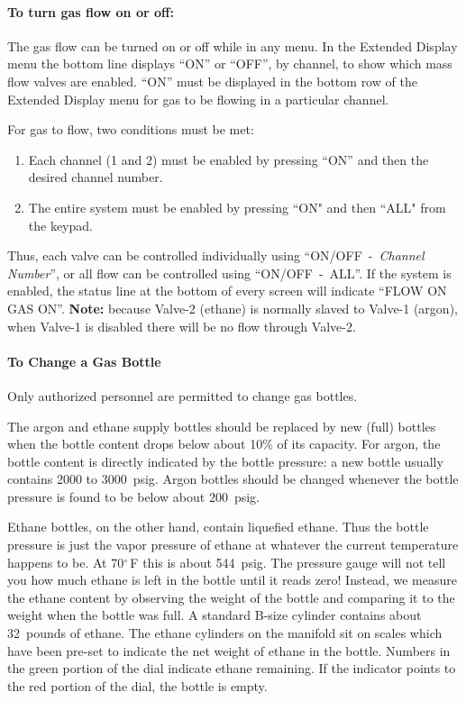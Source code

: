 {%
\paragraph{To turn gas flow on or off:}

The gas flow can be turned on or off while in any menu.  In the
Extended Display menu the bottom line displays ``ON'' or ``OFF'', by
channel, to show which mass flow valves are enabled.  ``ON'' must be
displayed in the bottom row of the Extended Display menu for gas to be
flowing in a particular channel.

For gas to flow, two conditions must be met:
\begin{enumerate}
\item Each channel (1 and 2) must be enabled by pressing ``ON'' and then the
  desired channel number.
\item The entire system must be enabled by pressing ``ON" and then ``ALL" from
  the keypad.
\end{enumerate}
Thus, each valve can be controlled individually using ``ON/OFF~-~\emph{Channel
Number}'', or all flow can be controlled using ``ON/OFF~-~ALL''. If the system
is enabled, the status line at the bottom of every screen will indicate ``FLOW
ON GAS ON''. {\bf Note:} because Valve-2 (ethane) is normally slaved to Valve-1
(argon), when Valve-1 is disabled there will be no flow through Valve-2.

\paragraph{To Change a Gas Bottle}

Only authorized personnel are permitted to change gas bottles.

The argon and ethane supply bottles should be replaced by new (full)
bottles when the bottle content drops below about 10\% of its
capacity.  For argon, the bottle content is directly indicated by the
bottle pressure: a new bottle usually contains 2000 to
3000~psig. Argon bottles should be changed whenever the bottle
pressure is found to be below about 200~psig.

Ethane bottles, on the
other hand, contain liquefied ethane. Thus the bottle pressure is just
the vapor pressure of ethane at whatever the current temperature
happens to be. At 70$^\circ$\,F this is about 544~psig. The pressure gauge
will not tell you how much ethane is left in the bottle until it reads
zero! Instead, we measure the ethane content by observing the weight
of the bottle and comparing it to the weight when the bottle was
full. A standard B-size cylinder contains about 32~pounds of ethane.
The ethane cylinders on the manifold sit on scales which have been
pre-set to indicate the net weight of ethane in the bottle.
Numbers in the green portion of the dial indicate ethane remaining.
If the indicator points to the red portion of the dial, the bottle
is empty.

}
